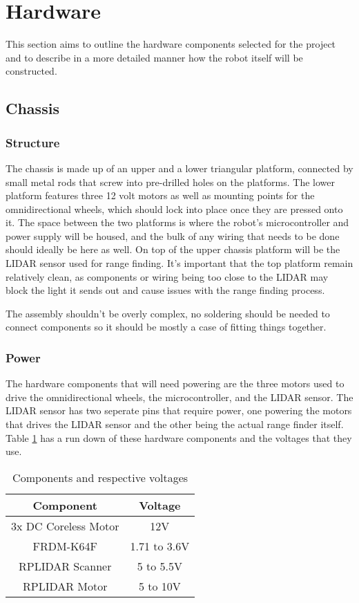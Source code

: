 	\section{Hardware}
	This section aims to outline the hardware components selected for the project and to describe in a more detailed manner how the robot itself will be constructed.
	
		\subsection{Chassis}
			\subsubsection{Structure}
			The chassis is made up of an upper and a lower triangular platform, connected by small metal rods that screw into pre-drilled holes on the platforms. The lower platform features three 12 volt motors as well as mounting points for the omnidirectional wheels, which should lock into place once they are pressed onto it. %
			The space between the two platforms is where the robot's microcontroller and power supply will be housed, and the bulk of any wiring that needs to be done should ideally be here as well. On top of the upper chassis platform will be the LIDAR sensor used for range finding. It's important that the top platform remain relatively clean, as components or wiring being too close to the LIDAR may block the light it sends out and cause issues with the range finding process.
			
			The assembly shouldn't be overly complex, no soldering should be needed to connect components so it should be mostly a case of fitting things together.
			
			\subsubsection{Power}
			The hardware components that will need powering are the three motors used to drive the omnidirectional wheels, the microcontroller, and the LIDAR sensor. The LIDAR sensor has two seperate pins that require power, one powering the motors that drives the LIDAR sensor and the other being the actual range finder itself. Table \ref{table:1} has a run down of these hardware components and the voltages that they use.
			
			\begin{table}[h!]
				\centering
				\begin{tabular}{||c | c||} 
					\hline
					Component & Voltage \\ [0.5ex] 
					\hline\hline
					3x DC Coreless Motor  & 12V  \\ 
					FRDM-K64F  & 1.71 to 3.6V   \\
					RPLIDAR Scanner  & 5 to 5.5V  \\
					RPLIDAR Motor & 5 to 10V  \\ [1ex] 
					\hline
				\end{tabular}
				\caption{Components and respective voltages}
				\label{table:1}
			\end{table}
		
